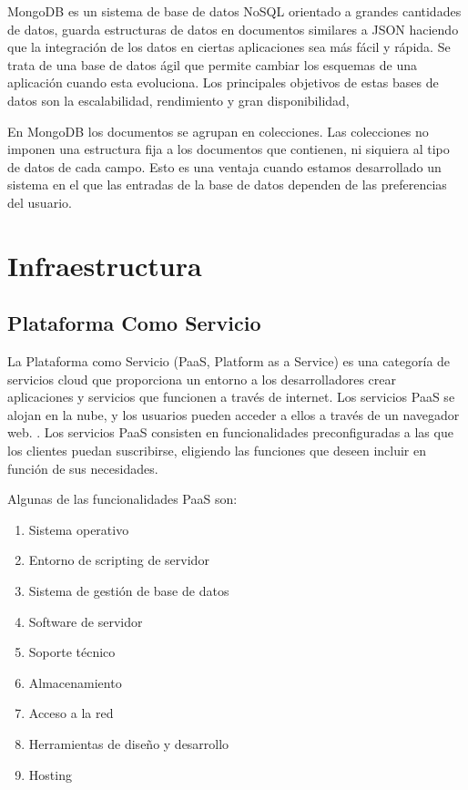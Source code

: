 \documentclass[a4paper,11pt]{book}
\begin{document}
MongoDB es un sistema de base de datos NoSQL orientado a grandes cantidades de datos, guarda estructuras de datos en documentos similares a JSON haciendo que la integración de los datos en ciertas aplicaciones sea más fácil y rápida.
Se trata de una base de datos ágil que permite cambiar los esquemas de una aplicación cuando esta evoluciona. Los principales objetivos de estas bases de datos son la escalabilidad, rendimiento y gran disponibilidad,

En MongoDB los documentos se agrupan en colecciones. Las colecciones  no imponen una estructura fija a los documentos que contienen, ni siquiera al tipo de datos de cada campo. Esto es una ventaja cuando estamos desarrollado un sistema en el que las entradas de la base de datos dependen de las preferencias del usuario.  
  
\section{Infraestructura}
\subsection{Plataforma Como Servicio}

La Plataforma como Servicio\cite{paas} (PaaS, Platform as a Service) es una categoría de servicios cloud que proporciona un entorno a los desarrolladores crear aplicaciones y servicios que funcionen a través de internet. Los servicios PaaS se alojan en la nube, y los usuarios pueden acceder a ellos a través de un navegador web. . Los servicios PaaS consisten en funcionalidades preconfiguradas a las que los clientes puedan suscribirse, eligiendo las funciones que deseen incluir en función de sus necesidades.

Algunas de las funcionalidades PaaS son:

\begin{enumerate}
\item Sistema operativo 
\item Entorno de scripting de servidor 
\item Sistema de gestión de base de datos 
\item Software de servidor 
\item Soporte técnico 
\item Almacenamiento 
\item Acceso a la red 
\item Herramientas de diseño y desarrollo 
\item Hosting 
\end{enumerate}
\end{document}

